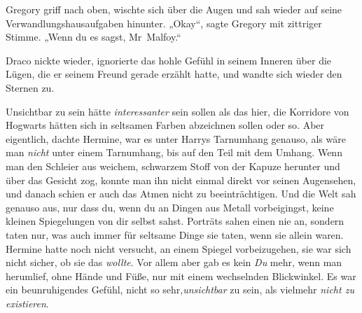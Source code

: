 Gregory griff nach oben, wischte sich über die Augen und sah wieder auf seine Verwandlungshausaufgaben hinunter. „Okay“, sagte Gregory mit zittriger Stimme. „Wenn du es sagst, Mr~Malfoy.“

Draco nickte wieder, ignorierte das hohle Gefühl in seinem Inneren über die Lügen, die er seinem Freund gerade erzählt hatte, und wandte sich wieder den Sternen zu.


Unsichtbar zu sein hätte \emph{interessanter} sein sollen als das hier, die Korridore von Hogwarts hätten sich in seltsamen Farben abzeichnen sollen oder so. Aber eigentlich, dachte Hermine, war es unter Harrys Tarnumhang genauso, als wäre man \emph{nicht} unter einem Tarnumhang, bis auf den Teil mit dem Umhang. Wenn man den Schleier aus weichem, schwarzem Stoff von der Kapuze herunter und über das Gesicht zog, konnte man ihn nicht einmal direkt vor seinen Augensehen, und danach schien er auch das Atmen nicht zu beeinträchtigen. Und die Welt sah genauso aus, nur dass du, wenn du an Dingen aus Metall vorbeigingst, keine kleinen Spiegelungen von dir selbst sahst. Porträts sahen einen nie an, sondern taten nur, was auch immer für seltsame Dinge sie taten, wenn sie allein waren. Hermine hatte noch nicht versucht, an einem Spiegel vorbeizugehen, sie war sich nicht sicher, ob sie das \emph{wollte}. Vor allem aber gab es kein \emph{Du} mehr, wenn man herumlief, ohne Hände und Füße, nur mit einem wechselnden Blickwinkel. Es war ein beunruhigendes Gefühl, nicht so sehr,\emph{unsichtbar} zu sein, als vielmehr \emph{nicht zu existieren}.

